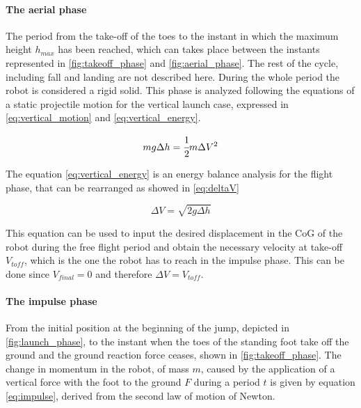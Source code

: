 \paragraph{The aerial phase}
The period from the take-off of the toes to the instant in which the maximum height $h_{max}$ has been reached, which can takes place between the instants represented in \ref{fig:takeoff_phase} and \ref{fig:aerial_phase}. 
The rest of the cycle, including fall and landing are not described here.
During the whole period the robot is considered a rigid solid.
This phase is analyzed following the equations of a static projectile motion for the vertical launch case, expressed in \ref{eq:vertical_motion} and \ref{eq:vertical_energy}.


\begin{equation}
\label{eq:vertical_energy}
	m g \Delta h = \cfrac{1}{2} m \Delta V^2
\end{equation}

The equation \ref{eq:vertical_energy} is an energy balance analysis for the flight phase, that can be rearranged as showed in \ref{eq:deltaV}

\begin{equation}
\label{eq:deltaV}
	\Delta V = \sqrt{2 g \Delta h}
\end{equation}

This equation can be used to input the desired displacement in the CoG of the robot during the free flight period and obtain the necessary velocity at take-off $V_{toff}$, which is the one the robot has to reach in the impulse phase.
This can be done since $V_{final} = 0$ and therefore $\Delta V = V_{toff}$.

\paragraph{The impulse phase}
From the initial position at the beginning of the jump, depicted in \ref{fig:launch_phase}, to the instant when the toes of the standing foot take off the ground and the ground reaction force ceases, shown in \ref{fig:takeoff_phase}.
The change in momentum in the robot, of mass $m$, caused by the application of a vertical force with the foot to the ground $F$ during a period $t$ is given by equation \ref{eq:impulse}, derived from the second law of motion of Newton.

